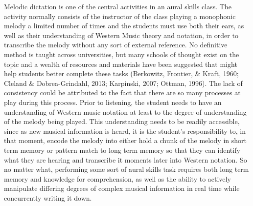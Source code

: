 \documentclass[]{book}
\begin{document}
Melodic dictation is one of the central activities in an aural
skills class.
The activity normally consists of the instructor of the class playing a monophonic melody a limited number of times and the students must use both their ears, as well as their understanding of Western Music theory and notation, in order to transcribe the melody without any sort of external reference.
No definitive method is taught across universities, but many schools of thought exist on the topic and a wealth of resources and materials have been suggested that might help students better complete these tasks (Berkowitz, Frontier, \& Kraft, 1960; Cleland \& Dobrea-Grindahl, 2013; Karpinski, 2007; Ottman, 1996).
The lack of consistency could be attributed to the fact that there are so many processes at play during this process.
Prior to listening, the student needs to have an understanding of Western music notation at least to the degree of understanding of the melody being played.
This understanding needs to be readily accessible, since as new musical information is heard, it is the student's responsibility to, in that moment, encode the melody into either hold a chunk of the melody in short term memory or pattern match to long term memory so that they can identify what they are hearing and transcribe it moments later into Western notation.
So no matter what, performing some sort of aural skills task requires both long term memory and knowledge for comprehension, as well as the ability to actively manipulate differing degrees of complex musical information in real time while concurrently writing it down.
\end{document}
